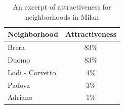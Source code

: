 \documentclass[
]{ceurart}
\renewcommand{\sf}[1]{\textsf{\textup{#1}}}
\begin{document}
\begin{table}[t]
    \centering
    \scriptsize
    \caption{An excerpt of attractiveness for neighborhoods in \sf{Milan}}
    \label{tbl:att}
    \begin{tabular}{lc}
    \toprule
        Neighborhood & Attractiveness \\
        \midrule
        Brera & 83\% \\ 
        Duomo & 83\% \\ 
        Lodi - Corvetto & 4\% \\ 
        Padova & 3\% \\
        Adriano & 1\% \\ \bottomrule
    \end{tabular}
\end{table}



\end{document}
